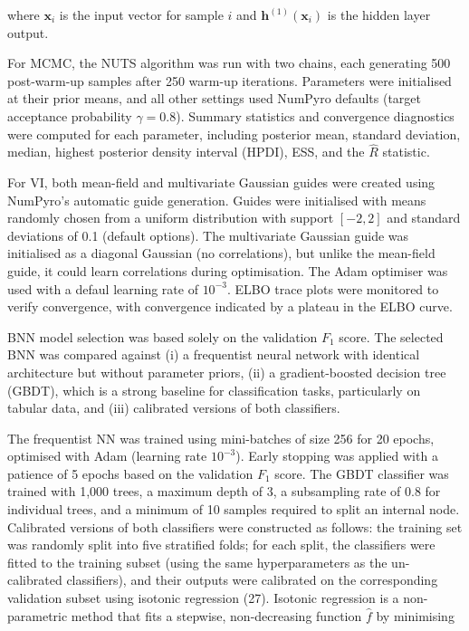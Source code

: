 \documentclass[
  a4paper,
]{scrreprt}
\begin{document}
where \(\mathbf{x}_i\) is the input vector for sample \(i\) and
\(\mathbf{h}^{(1)}(\mathbf{x}_i)\) is the hidden layer output.

For MCMC, the NUTS algorithm was run with two chains, each generating
500 post-warm-up samples after 250 warm-up iterations. Parameters were
initialised at their prior means, and all other settings used NumPyro
defaults (target acceptance probability \(\gamma=0.8\)). Summary
statistics and convergence diagnostics were computed for each parameter,
including posterior mean, standard deviation, median, highest posterior
density interval (HPDI), ESS, and the \(\hat{R}\) statistic.

For VI, both mean-field and multivariate Gaussian guides were created
using NumPyro's automatic guide generation. Guides were initialised with
means randomly chosen from a uniform distribution with support
\([-2, 2]\) and standard deviations of 0.1 (default options). The
multivariate Gaussian guide was initialised as a diagonal Gaussian (no
correlations), but unlike the mean-field guide, it could learn
correlations during optimisation. The Adam optimiser was used with a
defaul learning rate of \(10^{-3}\). ELBO trace plots were monitored to
verify convergence, with convergence indicated by a plateau in the ELBO
curve.

BNN model selection was based solely on the validation \(F_1\) score.
The selected BNN was compared against (i) a frequentist neural network
with identical architecture but without parameter priors, (ii) a
gradient-boosted decision tree (GBDT), which is a strong baseline for
classification tasks, particularly on tabular data, and (iii) calibrated
versions of both classifiers.

The frequentist NN was trained using mini-batches of size 256 for 20
epochs, optimised with Adam (learning rate \(10^{-3}\)). Early stopping
was applied with a patience of 5 epochs based on the validation \(F_1\)
score. The GBDT classifier was trained with 1,000 trees, a maximum depth
of 3, a subsampling rate of 0.8 for individual trees, and a minimum of
10 samples required to split an internal node. Calibrated versions of
both classifiers were constructed as follows: the training set was
randomly split into five stratified folds; for each split, the
classifiers were fitted to the training subset (using the same
hyperparameters as the un-calibrated classifiers), and their outputs
were calibrated on the corresponding validation subset using isotonic
regression (27). Isotonic regression is a non-parametric method that
fits a stepwise, non-decreasing function \(\hat{f}\) by minimising
\end{document}
